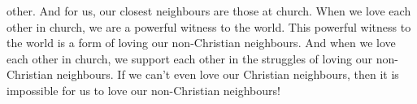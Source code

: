 \begin{itemize}
{  other. And for us, our closest neighbours are those at church. When we love
  each other in church, we are a powerful witness to the world. This powerful
  witness to the world is a form of loving our non-Christian neighbours. And
  when we love each other in church, we support each other in the struggles of loving our non-Christian neighbours. If we can't even love our Christian neighbours, then it is impossible for us to love our non-Christian neighbours! }
\end{itemize}